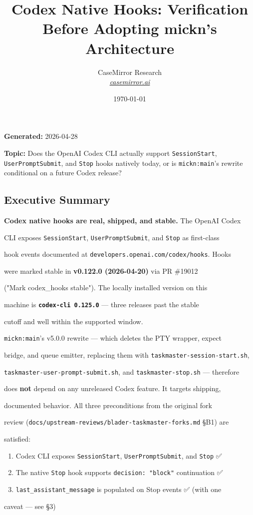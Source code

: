 \documentclass[twocolumn,10pt,letterpaper]{article}
\title{\vspace{-1.8em}\LARGE\bfseries\color{titlebg} Codex Native Hooks: Verification Before Adopting mickn's Architecture\vspace{-0.3em}}
\author{CaseMirror Research \\ \small\itshape\href{https://casemirror.ai}{\textcolor{headergray}{casemirror.ai}}}
\date{{\small\color{headergray} \today}}
\begin{document}
\maketitle
\thispagestyle{firstpage}
\vspace{-0.5em}


\textbf{Generated:} 2026-04-28

\textbf{Topic:} Does the OpenAI Codex CLI actually support \texttt{SessionStart}, \texttt{UserPromptSubmit}, and \texttt{Stop} hooks natively today, or is \texttt{mickn:main}'s rewrite conditional on a future Codex release?


\subsection{Executive Summary}

\textbf{Codex native hooks are real, shipped, and stable.} The OpenAI Codex

CLI exposes \texttt{SessionStart}, \texttt{UserPromptSubmit}, and \texttt{Stop} as first-class

hook events documented at \texttt{developers.openai.com/\allowbreak codex/\allowbreak hooks}. Hooks

were marked stable in \textbf{v0.122.0 (2026-04-20)} via PR \#19012

("Mark codex\_hooks stable"). The locally installed version on this

machine is \textbf{\texttt{codex-\allowbreak cli 0.125.0}} — three releases past the stable

cutoff and well within the supported window.


\texttt{mickn:main}'s v5.0.0 rewrite — which deletes the PTY wrapper, expect

bridge, and queue emitter, replacing them with \texttt{taskmaster-\allowbreak session-\allowbreak start.sh},

\texttt{taskmaster-\allowbreak user-\allowbreak prompt-\allowbreak submit.sh}, and \texttt{taskmaster-\allowbreak stop.sh} — therefore

does \textbf{not} depend on any unreleased Codex feature. It targets shipping,

documented behavior. All three preconditions from the original fork

review (\texttt{docs/\allowbreak upstream-\allowbreak reviews/\allowbreak blader-\allowbreak taskmaster-\allowbreak forks.md} §B1) are

satisfied:


\begin{enumerate}
\setlength{\itemsep}{0pt}
\setlength{\parskip}{0pt}
  \item Codex CLI exposes \texttt{SessionStart}, \texttt{UserPromptSubmit}, and \texttt{Stop} ✅
  \item The native \texttt{Stop} hook supports \texttt{decision: "block"} continuation ✅
  \item \texttt{last\_assistant\_message} is populated on Stop events ✅ (with one
\end{enumerate}
   caveat — see §3)
\end{document}
